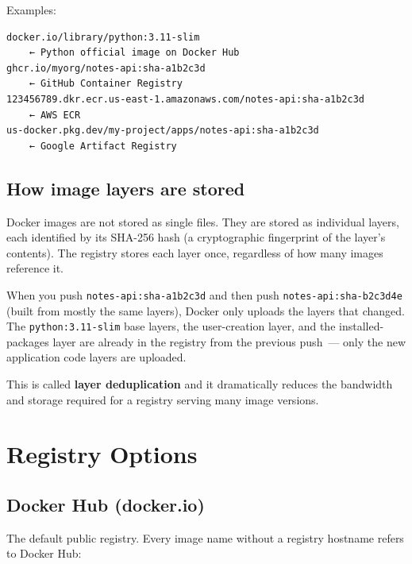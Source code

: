 \noindent{}Examples:

\begin{outputbox}[short]
\begin{Verbatim}[fontsize=\codesize, breaklines, breakanywhere, breaksymbolleft={\tiny\textcolor{muted}{$\hookrightarrow$}}]
docker.io/library/python:3.11-slim
    ← Python official image on Docker Hub
ghcr.io/myorg/notes-api:sha-a1b2c3d
    ← GitHub Container Registry
123456789.dkr.ecr.us-east-1.amazonaws.com/notes-api:sha-a1b2c3d
    ← AWS ECR
us-docker.pkg.dev/my-project/apps/notes-api:sha-a1b2c3d
    ← Google Artifact Registry
\end{Verbatim}
\end{outputbox}

\subsection*{How image layers are stored}\label{19-artifact-storage:how-image-layers-are-stored}

Docker images are not stored as single files. They are stored as individual layers, each identified by its SHA-256 hash (a cryptographic fingerprint of the layer's contents). The registry stores each layer once, regardless of how many images reference it.

When you push \texttt{notes-api:sha-a1b2c3d} and then push \texttt{notes-api:sha-b2c3d4e} (built from mostly the same layers), Docker only uploads the layers that changed. The \texttt{python:3.11-slim} base layers, the user-creation layer, and the installed-packages layer are already in the registry from the previous push~--- only the new application code layers are uploaded.

This is called \textbf{layer deduplication} and it dramatically reduces the bandwidth and storage required for a registry serving many image versions.

\setcounter{section}{1}
\section{Registry Options}\label{19-artifact-storage:192-registry-options}

\subsection*{Docker Hub (docker.io)}\label{19-artifact-storage:docker-hub-dockerio}

The default public registry. Every image name without a registry hostname refers to Docker Hub:

